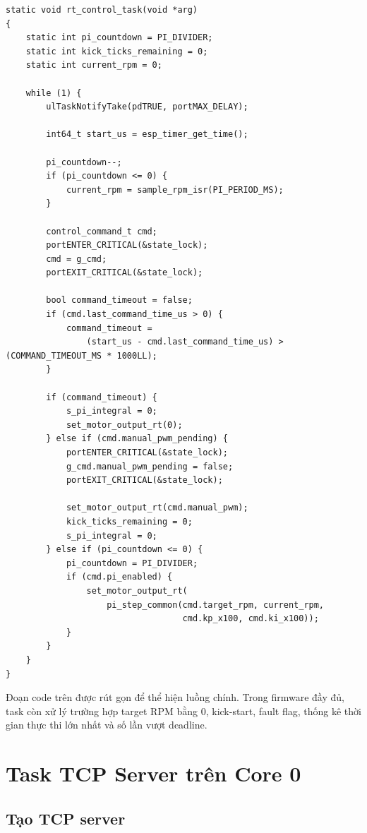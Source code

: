 \documentclass[12pt,a4paper]{report}
\begin{document}
\begin{lstlisting}
static void rt_control_task(void *arg)
{
    static int pi_countdown = PI_DIVIDER;
    static int kick_ticks_remaining = 0;
    static int current_rpm = 0;

    while (1) {
        ulTaskNotifyTake(pdTRUE, portMAX_DELAY);

        int64_t start_us = esp_timer_get_time();

        pi_countdown--;
        if (pi_countdown <= 0) {
            current_rpm = sample_rpm_isr(PI_PERIOD_MS);
        }

        control_command_t cmd;
        portENTER_CRITICAL(&state_lock);
        cmd = g_cmd;
        portEXIT_CRITICAL(&state_lock);

        bool command_timeout = false;
        if (cmd.last_command_time_us > 0) {
            command_timeout =
                (start_us - cmd.last_command_time_us) > (COMMAND_TIMEOUT_MS * 1000LL);
        }

        if (command_timeout) {
            s_pi_integral = 0;
            set_motor_output_rt(0);
        } else if (cmd.manual_pwm_pending) {
            portENTER_CRITICAL(&state_lock);
            g_cmd.manual_pwm_pending = false;
            portEXIT_CRITICAL(&state_lock);

            set_motor_output_rt(cmd.manual_pwm);
            kick_ticks_remaining = 0;
            s_pi_integral = 0;
        } else if (pi_countdown <= 0) {
            pi_countdown = PI_DIVIDER;
            if (cmd.pi_enabled) {
                set_motor_output_rt(
                    pi_step_common(cmd.target_rpm, current_rpm,
                                   cmd.kp_x100, cmd.ki_x100));
            }
        }
    }
}
\end{lstlisting}

Đoạn code trên được rút gọn để thể hiện luồng chính. Trong firmware đầy đủ, task còn xử lý trường hợp target RPM bằng 0, kick-start, fault flag, thống kê thời gian thực thi lớn nhất và số lần vượt deadline.

\section{Task TCP Server trên Core 0}

\subsection{Tạo TCP server}
\end{document}
